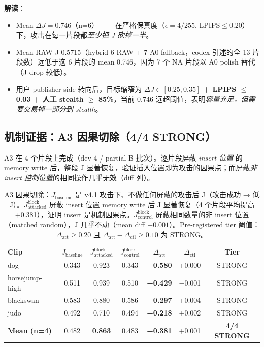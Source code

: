 \documentclass[11pt,a4paper]{ctexart}
\begin{document}
\textbf{解读}：
\begin{itemize}[leftmargin=2em]
    \item Mean $\Delta J = 0.746$（n=6）—— 在严格保真度（$\epsilon{=}4/255$, LPIPS$\leq$0.20）下，攻击在每一片段都\emph{至少把 J 砍掉一半}。
    \item Mean RAW J 0.5715（hybrid 6 RAW + 7 A0 fallback，codex 引述的全 13 片段数）远低于这 6 片段的 mean 0.746，因为 7 个 NA 片段以 A0 polish 替代（J-drop 较低）。
    \item 用户 publisher-side 转向后，目标缩窄为 \textbf{$\Delta J \in [0.25, 0.35]$ + LPIPS $\leq$ 0.03 + 人工 stealth $\geq$ 85\%}，当前 0.746 远超阈值，表明\emph{容量充足，但需要交易掉一部分到 stealth}。
\end{itemize}

\subsection{机制证据：A3 因果切除（4/4 STRONG）}

A3 在 4 个片段上完成（dev-4 / partial-B 批次）。逐片段屏蔽 \emph{insert 位置} 的 memory write 后，整段 J 显著恢复，验证插入位置即为攻击的因果点；而屏蔽\emph{非 insert 控制位置}的相同操作几乎无效（diff 列）。

\begin{table}[h]
\centering
\small
\begin{tabular}{lcccccc}
\toprule
\textbf{Clip} & $J_{\mathrm{baseline}}$ & $J_{\mathrm{attacked}}^{\mathrm{block}}$ & $J_{\mathrm{control}}^{\mathrm{block}}$ & $\Delta_{\mathrm{att}}$ & $\Delta_{\mathrm{ctl}}$ & \textbf{Tier} \\
\midrule
dog            & 0.343 & 0.923 & 0.343 & \textbf{+0.580} & +0.000 & STRONG \\
horsejump-high & 0.511 & 0.939 & 0.510 & \textbf{+0.429} & $-$0.001 & STRONG \\
blackswan      & 0.583 & 0.880 & 0.586 & \textbf{+0.297} & +0.004 & STRONG \\
judo           & 0.492 & 0.710 & 0.494 & \textbf{+0.218} & +0.002 & STRONG \\
\midrule
\textbf{Mean (n=4)} & 0.482 & \textbf{0.863} & 0.483 & \textbf{+0.381} & +0.001 & \textbf{4/4 STRONG} \\
\bottomrule
\end{tabular}
\caption{A3 因果切除：$J_{\mathrm{baseline}}$ 是 v4.1 攻击下、不做任何屏蔽的攻击后 J（攻击成功 → 低 J）。$J_{\mathrm{attacked}}^{\mathrm{block}}$ 屏蔽 insert 位置 memory write 后 J 显著恢复（4 个片段平均提高 +0.381），证明 insert 是机制因果点。$J_{\mathrm{control}}^{\mathrm{block}}$ 屏蔽相同数量的非 insert 位置（matched random），J 几乎不动（mean diff $+0.001$）。Pre-registered tier 阈值：$\Delta_{\mathrm{att}}\geq 0.20$ 且 $\Delta_{\mathrm{att}}-\Delta_{\mathrm{ctl}}\geq 0.10$ 为 STRONG。}
\label{tab:a3}
\end{table}
\end{document}
